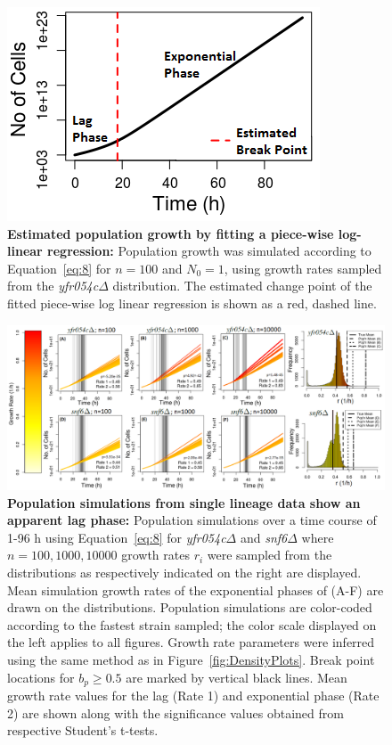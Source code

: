 \documentclass{bioinfo}
\begin{document}
\vspace{-1.8em}
\begin{figure}[H]
\centering
\includegraphics[width=0.6\linewidth]{Ch1Segmentation.png}
\vspace{-1em}
\caption{\footnotesize{\textbf{Estimated population growth by fitting a piece-wise log-linear regression:} Population growth was simulated according to Equation~\ref{eq:8} for $n=100$ and $N_0=1$, using growth rates sampled from the \textit{yfr054c$\Delta$} distribution. The estimated change point of the fitted piece-wise log linear regression is shown as a red, dashed line.}}
\label{fig:PieceWise}
\end{figure}
\vspace{-3em} 

\setcounter{figure}{4}
\begin{figure}[hb!]
\includegraphics[width=1\linewidth]{Ch1PopSim.png} 
\vspace{-2.5em}
\caption{\footnotesize{\textbf{Population simulations from single lineage data show an apparent lag phase:} Population simulations over a time course of 1-96 h using Equation~\ref{eq:8} for \textit{yfr054c}$\Delta$ and \textit{snf6}$\Delta$ where $n=100, 1000, 10000$ growth rates $r_i$ were sampled from the distributions as respectively indicated on the right are displayed. Mean simulation growth rates of the exponential phases of (A-F) are drawn on the distributions. Population simulations are color-coded according to the fastest strain sampled; the color scale displayed on the left applies to all figures. Growth rate parameters were inferred using the same method as in Figure~\ref{fig:DensityPlots}. Break point locations for $b_p\geq 0.5$ are marked by vertical black lines. Mean growth rate values for the lag (Rate 1) and exponential phase (Rate 2) are shown along with the significance values obtained from respective Student's t-tests.}}
\label{fig:PopSims}
\vspace{-3em}
\end{figure}
\setcounter{figure}{2}
\end{document}
